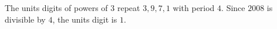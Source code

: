 The units digits of powers of $3$ repeat $3,9,7,1$ with period $4$. Since $2008$ is divisible by $4$, the units digit is $\boxed1$.
